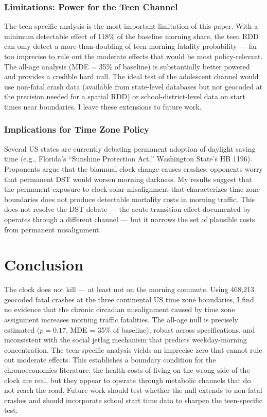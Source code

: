 \documentclass[12pt]{article}
\begin{document}
\subsubsection*{Limitations: Power for the Teen Channel} The teen-specific analysis is the most important limitation of this paper. With a minimum detectable effect of 118\% of the baseline morning share, the teen RDD can only detect a more-than-doubling of teen morning fatality probability --- far too imprecise to rule out the moderate effects that would be most policy-relevant. The all-age analysis (MDE = 35\% of baseline) is substantially better powered and provides a credible hard null. The ideal test of the adolescent channel would use non-fatal crash data (available from state-level databases but not geocoded at the precision needed for a spatial RDD) or school-district-level data on start times near boundaries. I leave these extensions to future work.

\subsubsection*{Implications for Time Zone Policy} Several US states are currently debating permanent adoption of daylight saving time (e.g., Florida's ``Sunshine Protection Act,'' Washington State's HB 1196). Proponents argue that the biannual clock change causes crashes; opponents worry that permanent DST would worsen morning darkness. My results suggest that the permanent exposure to clock-solar misalignment that characterizes time zone boundaries does not produce detectable mortality costs in morning traffic. This does not resolve the DST debate --- the acute transition effect documented by \citet{smith2016tz} operates through a different channel --- but it narrows the set of plausible costs from permanent misalignment.

\section{Conclusion}

The clock does not kill --- at least not on the morning commute. Using 468,213 geocoded fatal crashes at the three continental US time zone boundaries, I find no evidence that the chronic circadian misalignment caused by time zone assignment increases morning traffic fatalities. The all-age null is precisely estimated ($p = 0.17$, MDE = 35\% of baseline), robust across specifications, and inconsistent with the social jetlag mechanism that predicts weekday-morning concentration. The teen-specific analysis yields an imprecise zero that cannot rule out moderate effects. This establishes a boundary condition for the chronoeconomics literature: the health costs of living on the wrong side of the clock are real, but they appear to operate through metabolic channels that do not reach the road. Future work should test whether the null extends to non-fatal crashes and should incorporate school start time data to sharpen the teen-specific test.
\end{document}
